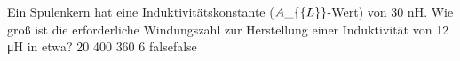     {Ein Spulenkern hat eine Induktivitätskonstante ($A\_\{\textrm\{L\}\}$-Wert) von 30 nH. Wie groß ist die erforderliche Windungszahl zur Herstellung einer Induktivität von 12 μH in etwa?}
    {20}
    {400}
    {360}
    {6}
    {false}{false}